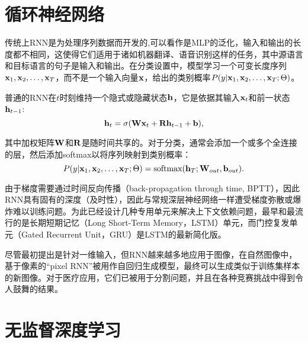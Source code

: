 \section{循环神经网络}
\label{sec:rnns}

传统上RNN是为处理序列数据而开发的,可以看作是MLP的泛化，输入和输出的长度都不相同，这使得它们适用于诸如机器翻译、语音识别这样的任务，其中源语言和目标语言的句子是输入和输出。在分类设置中，模型学习一个可变长度序列${\bf x}_{1}, {\bf x}_{2}, \ldots, {\bf x}_{T}$，而不是一个输入向量${\bf x}$，给出的类别概率$P(y | {\bf x}_{1}, {\bf x}_{2}, \ldots, {\bf x}_{T}; \Theta)$。

普通的RNN在$t$时刻维持一个隐式或隐藏状态${\bf h} $，它是依据其输入${\bf x}_{t}$和前一状态${\bf h}_{t-1}$:
\begin{equation}
 {\bf h}_{t} = \sigma({\bf W}{\bf x}_{t} + {\bf R}{\bf h}_{t - 1} + {\bf b}),
\end{equation}

其中加权矩阵${\bf W}$和${\bf R}$是随时间共享的。对于分类，通常会添加一个或多个全连接的层，然后添加softmax以将序列映射到类别概率： 
\begin{equation}
 P(y | {\bf x}_{1}, {\bf x}_{2}, \ldots, {\bf x}_{T}; \Theta) = \text{softmax}( {\bf h}_{T}; {\bf W}_{out}, {\bf b}_{out}).
\end{equation}

由于梯度需要通过时间反向传播（back-propagation through time, BPTT），因此RNN具有固有的深度（及时性），因此与常规深层神经网络一样遭受梯度弥散或爆炸难以训练问题。为此已经设计几种专用单元来解决上下文依赖问题，最早和最流行的是长期短期记忆（Long Short-Term Memory，LSTM）单元\citep{Hochreiter1997Long}，而门控复发单元（Gated Recurrent Unit，GRU）\citep{Cho2014Learning}是LSTM的最新简化版。

尽管最初提出是针对一维输入，但RNN越来越多地应用于图像，在自然图像中，基于像素的“pixel RNN”被用作自回归生成模型，最终可以生成类似于训练集样本的新图像。对于医疗应用，它们已被用于分割问题，并且在各种竞赛挑战中得到令人鼓舞的结果\citep{Stollenga2015Parallel}。

\section{无监督深度学习}
